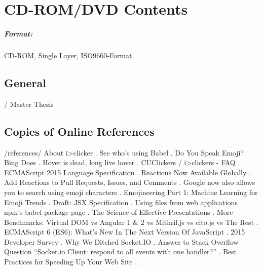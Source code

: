 \chapter{CD-ROM/DVD  Contents}
\label{app:cdrom}

\paragraph{Format:}
		CD-ROM, Single Layer, ISO9660-Format%


\section{General}

\begin{FileList}{/}
 Master Thesis
\end{FileList}

\section{Copies of Online References}

\begin{FileList}{/references/}
 About i>clicker \cite{iclicker}.
 See who's using Babel \cite{babel-users}.
 Do You Speak Emoji? Bing Does \cite{Bing:Emoji}.
 Hover is dead, long live hover \cite{hover}.
 CUClickers / i>clickers - FAQ \cite{cuclickers:faq}.
 ECMAScript 2015 Language Specification \cite{ecma2015}.
 Reactions Now Available Globally \cite{Facebook:Reactions}.
 Add Reactions to Pull Requests, Issues, and Comments \cite{Github:Reactions}.
 Google now also allows you to search using emoji characters \cite{Google:Emoji}.
 Emojineering Part 1: Machine Learning for Emoji Trends \cite{Instagramm:Emoji}.
 Draft: JSX Specification \cite{jsx}.
 Using files from web applications \cite{file-api}.
 npm's babel package page \cite{npm-babel}.
 The Science of Effective Presentations \cite{prezi-science}.
 More Benchmarks: Virtual DOM vs Angular 1 \& 2 vs Mithril.js vs cito.js vs The Rest \cite{react-benchmarks}.
 ECMAScript 6 (ES6): What's New In The Next Version Of JavaScript \cite{es6}.
 2015 Developer Survey \cite{stackoverflow-developer-survey}.
 Why We Ditched Socket.IO \cite{socketio-problems}.
 Answer to Stack Overflow Question ``Socket.io Client: respond to all events with one handler?'' \cite{socket-io-wildcards}.
 Best Practices for Speeding Up Your Web Site \cite{yahoo-speeding-up-website}.
\end{FileList}

